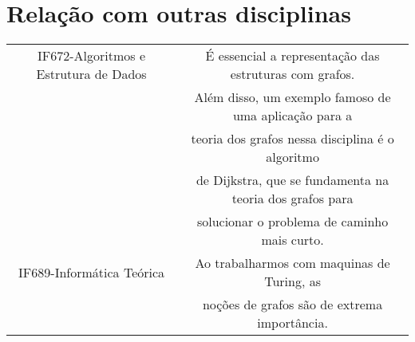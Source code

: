 \documentclass[10pt]{article}
\begin{document}
\section{Relação com outras disciplinas}

\begin{tabular}{|c|c|}
\hline
IF672-Algoritmos e Estrutura de Dados & É essencial a representação das estruturas com grafos.\\ 
& Além disso, um exemplo famoso de uma aplicação para a\\
& teoria dos grafos nessa disciplina é o algoritmo \\
& de Dijkstra, que se fundamenta na teoria dos grafos para\\
& solucionar o problema de caminho mais curto.\\ \hline
IF689-Informática Teórica & Ao trabalharmos com maquinas de Turing, as\\
& noções de grafos são de extrema importância.\\ \hline
\end{tabular}


\end{document}
